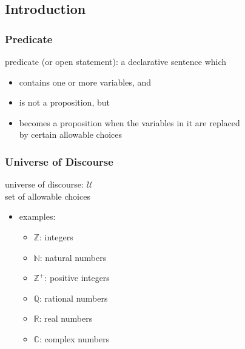 \documentclass[dvipsnames]{beamer}
\begin{document}
\subsection{Introduction}

\begin{frame}
  \frametitle{Predicate}

  \begin{definition}
    \alert{predicate} (or \alert{open statement}): a declarative sentence which
    \begin{itemize}
      \item contains one or more variables, and
      \item is not a proposition, but
      \item becomes a proposition when the variables in it are replaced\\
        by certain allowable choices
    \end{itemize}
  \end{definition}
\end{frame}

\begin{frame}
  \frametitle{Universe of Discourse}

  \begin{definition}
    \alert{universe of discourse}: $\mathcal{U}$\\
    set of allowable choices
  \end{definition}

  \pause
  \begin{itemize}
    \item examples:
    \begin{itemize}
      \item $\mathbb{Z}$: integers
      \item $\mathbb{N}$: natural numbers
      \item $\mathbb{Z}^+$: positive integers
      \item $\mathbb{Q}$: rational numbers
      \item $\mathbb{R}$: real numbers
      \item $\mathbb{C}$: complex numbers
    \end{itemize}
  \end{itemize}
\end{frame}
\end{document}
